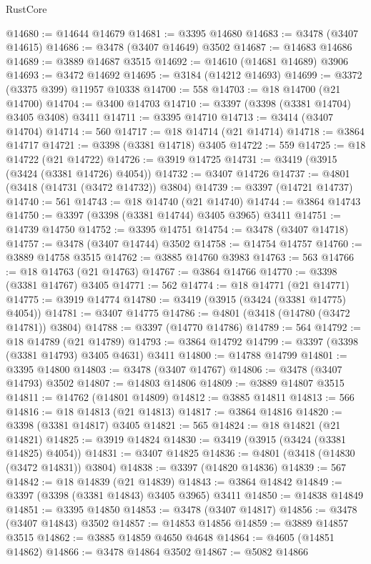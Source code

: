 \begin{lexlean}{RustCore}
\begin{coremodule}
@14680 := @14644 @14679
@14681 := @3395 @14680
@14683 := @3478 (@3407 @14615)
@14686 := @3478 (@3407 @14649) @3502
@14687 := @14683 @14686
@14689 := @3889 @14687 @3515
@14692 := @14610 (@14681 @14689) @3906
@14693 := @3472 @14692
@14695 := @3184 (@14212 @14693)
@14699 := @3372 (@3375 @399) @11957 @10338
@14700 := 558
@14703 := @18 @14700 (@21 @14700)
@14704 := @3400 @14703
@14710 := @3397 (@3398 (@3381 @14704) @3405 @3408) @3411
@14711 := @3395 @14710
@14713 := @3414 (@3407 @14704)
@14714 := 560
@14717 := @18 @14714 (@21 @14714)
@14718 := @3864 @14717
@14721 := @3398 (@3381 @14718) @3405
@14722 := 559
@14725 := @18 @14722 (@21 @14722)
@14726 := @3919 @14725
@14731 := @3419 (@3915 (@3424 (@3381 @14726) @4054))
@14732 := @3407 @14726
@14737 := @4801 (@3418 (@14731 (@3472 @14732)) @3804)
@14739 := @3397 (@14721 @14737)
@14740 := 561
@14743 := @18 @14740 (@21 @14740)
@14744 := @3864 @14743
@14750 := @3397 (@3398 (@3381 @14744) @3405 @3965) @3411
@14751 := @14739 @14750
@14752 := @3395 @14751
@14754 := @3478 (@3407 @14718)
@14757 := @3478 (@3407 @14744) @3502
@14758 := @14754 @14757
@14760 := @3889 @14758 @3515
@14762 := @3885 @14760 @3983
@14763 := 563
@14766 := @18 @14763 (@21 @14763)
@14767 := @3864 @14766
@14770 := @3398 (@3381 @14767) @3405
@14771 := 562
@14774 := @18 @14771 (@21 @14771)
@14775 := @3919 @14774
@14780 := @3419 (@3915 (@3424 (@3381 @14775) @4054))
@14781 := @3407 @14775
@14786 := @4801 (@3418 (@14780 (@3472 @14781)) @3804)
@14788 := @3397 (@14770 @14786)
@14789 := 564
@14792 := @18 @14789 (@21 @14789)
@14793 := @3864 @14792
@14799 := @3397 (@3398 (@3381 @14793) @3405 @4631) @3411
@14800 := @14788 @14799
@14801 := @3395 @14800
@14803 := @3478 (@3407 @14767)
@14806 := @3478 (@3407 @14793) @3502
@14807 := @14803 @14806
@14809 := @3889 @14807 @3515
@14811 := @14762 (@14801 @14809)
@14812 := @3885 @14811
@14813 := 566
@14816 := @18 @14813 (@21 @14813)
@14817 := @3864 @14816
@14820 := @3398 (@3381 @14817) @3405
@14821 := 565
@14824 := @18 @14821 (@21 @14821)
@14825 := @3919 @14824
@14830 := @3419 (@3915 (@3424 (@3381 @14825) @4054))
@14831 := @3407 @14825
@14836 := @4801 (@3418 (@14830 (@3472 @14831)) @3804)
@14838 := @3397 (@14820 @14836)
@14839 := 567
@14842 := @18 @14839 (@21 @14839)
@14843 := @3864 @14842
@14849 := @3397 (@3398 (@3381 @14843) @3405 @3965) @3411
@14850 := @14838 @14849
@14851 := @3395 @14850
@14853 := @3478 (@3407 @14817)
@14856 := @3478 (@3407 @14843) @3502
@14857 := @14853 @14856
@14859 := @3889 @14857 @3515
@14862 := @3885 @14859 @4650 @4648
@14864 := @4605 (@14851 @14862)
@14866 := @3478 @14864 @3502
@14867 := @5082 @14866

\end{coremodule}
\end{lexlean}
